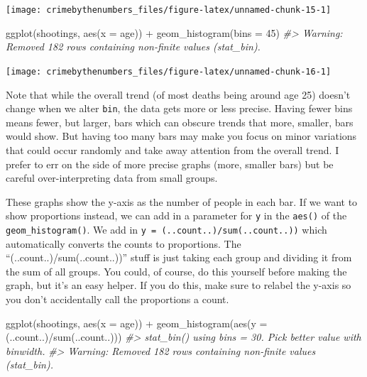 \documentclass[
]{krantz}
\makeatletter
\newenvironment{Shaded}{\begin{snugshade}}{\end{snugshade}}
\newcommand{\AttributeTok}[1]{\textcolor[rgb]{0.61,0.61,0.61}{#1}}
\newcommand{\CommentTok}[1]{\textcolor[rgb]{0.37,0.37,0.37}{\textit{#1}}}
\newcommand{\DecValTok}[1]{\textcolor[rgb]{0.06,0.06,0.06}{#1}}
\newcommand{\FunctionTok}[1]{\textcolor[rgb]{0,0,0}{#1}}
\newcommand{\NormalTok}[1]{#1}
\newcommand{\SpecialCharTok}[1]{\textcolor[rgb]{0,0,0}{#1}}
\newenvironment{kframe}{%
\medskip{}
\setlength{\fboxsep}{.8em}
 \def\at@end@of@kframe{}%
 \ifinner\ifhmode%
  \def\at@end@of@kframe{\end{minipage}}%
  \begin{minipage}{\columnwidth}%
 \fi\fi%
 \def\FrameCommand##1{\hskip\@totalleftmargin \hskip-\fboxsep
 \colorbox{shadecolor}{##1}\hskip-\fboxsep
     \hskip-\linewidth \hskip-\@totalleftmargin \hskip\columnwidth}%
 \MakeFramed {\advance\hsize-\width
   \@totalleftmargin\z@ \linewidth\hsize
   \@setminipage}}%
 {\par\unskip\endMakeFramed%
 \at@end@of@kframe}
\renewenvironment{Shaded}{\begin{kframe}}{\end{kframe}}
\makeatother
\begin{document}
\begin{center}\texttt{[image: crimebythenumbers\_files/figure-latex/unnamed-chunk-15-1]} \end{center}

\begin{Shaded}
\begin{Highlighting}[]
\FunctionTok{ggplot}\NormalTok{(shootings, }\FunctionTok{aes}\NormalTok{(}\AttributeTok{x =}\NormalTok{ age)) }\SpecialCharTok{+} 
  \FunctionTok{geom\_histogram}\NormalTok{(}\AttributeTok{bins =} \DecValTok{45}\NormalTok{)}
\CommentTok{\#\textgreater{} Warning: Removed 182 rows containing non{-}finite values (stat\_bin).}
\end{Highlighting}
\end{Shaded}

\begin{center}\texttt{[image: crimebythenumbers\_files/figure-latex/unnamed-chunk-16-1]} \end{center}

Note that while the overall trend (of most deaths being around age 25) doesn't change when we alter \texttt{bin}, the data gets more or less precise. Having fewer bins means fewer, but larger, bars which can obscure trends that more, smaller, bars would show. But having too many bars may make you focus on minor variations that could occur randomly and take away attention from the overall trend. I prefer to err on the side of more precise graphs (more, smaller bars) but be careful over-interpreting data from small groups.

These graphs show the y-axis as the number of people in each bar. If we want to show proportions instead, we can add in a parameter for \texttt{y} in the \texttt{aes()} of the \texttt{geom\_histogram()}. We add in \texttt{y\ =\ (..count..)/sum(..count..))} which automatically converts the counts to proportions. The ``(..count..)/sum(..count..))'' stuff is just taking each group and dividing it from the sum of all groups. You could, of course, do this yourself before making the graph, but it's an easy helper. If you do this, make sure to relabel the y-axis so you don't accidentally call the proportions a count.

\begin{Shaded}
\begin{Highlighting}[]
\FunctionTok{ggplot}\NormalTok{(shootings, }\FunctionTok{aes}\NormalTok{(}\AttributeTok{x =}\NormalTok{ age)) }\SpecialCharTok{+} 
  \FunctionTok{geom\_histogram}\NormalTok{(}\FunctionTok{aes}\NormalTok{(}\AttributeTok{y =}\NormalTok{ (..count..)}\SpecialCharTok{/}\FunctionTok{sum}\NormalTok{(..count..)))}
\CommentTok{\#\textgreater{} \textasciigrave{}stat\_bin()\textasciigrave{} using \textasciigrave{}bins = 30\textasciigrave{}. Pick better value with \textasciigrave{}binwidth\textasciigrave{}.}
\CommentTok{\#\textgreater{} Warning: Removed 182 rows containing non{-}finite values (stat\_bin).}
\end{Highlighting}
\end{Shaded}
\end{document}

